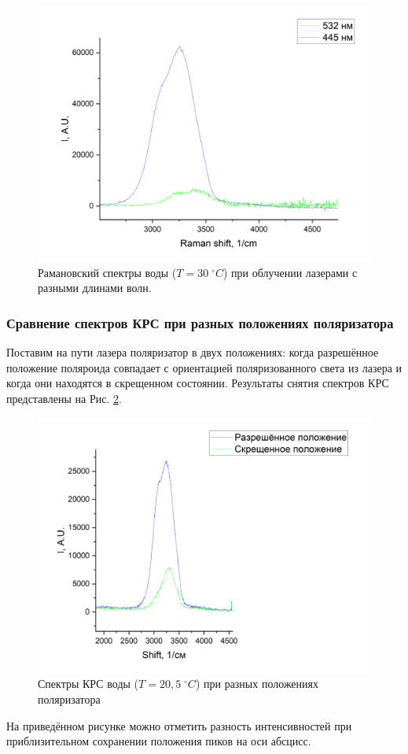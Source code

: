\documentclass{article}
\begin{document}
\begin{figure}[h!]
\centering
    \includegraphics[width=0.6\linewidth]{Images/Вода; сравнение лазеров.png}
    \caption{Рамановский спектры воды ($T = 30 \; ^{\circ}C$) при облучении лазерами с разными длинами волн.}
    \label{Вода, сравнение}
\end{figure}

\subsubsection{Сравнение спектров КРС при разных положениях поляризатора}\;

\par Поставим на пути лазера поляризатор в двух положениях: когда разрешённое положение поляроида совпадает с ориентацией поляризованного света из лазера и когда они находятся в скрещенном состоянии. Результаты снятия спектров КРС представлены на Рис. \ref{Вода, поляризация}.

\begin{figure}[h!]
\centering
    \includegraphics[width=0.6\linewidth]{Images/Вода; сравнение поляризаций.png}
    \caption{Спектры КРС воды ($T = 20,5 \; ^{\circ}C$) при разных положениях поляризатора}
    \label{Вода, поляризация}
\end{figure}

На приведённом рисунке можно отметить разность интенсивностей при приблизительном сохранении положения пиков на оси абсцисс. 
\end{document}
